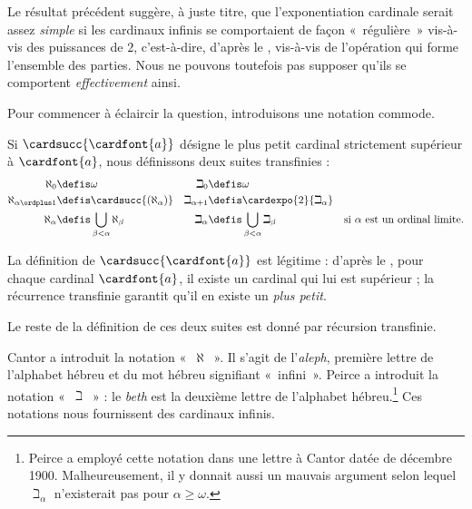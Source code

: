 \documentclass[../../../include/open-logic-section]{subfiles}
\begin{document}


Le résultat précédent suggère, à juste titre,
que l'exponentiation cardinale serait assez
\emph{simple} si les cardinaux infinis se comportaient
de façon «~régulière~» vis-à-vis des puissances de $2$,
c'est-à-dire, d'après le
, vis-à-vis
de l'opération qui forme l'ensemble des parties.
Nous ne pouvons toutefois pas supposer qu'ils
se comportent \emph{effectivement} ainsi.

Pour commencer à éclaircir la question,
introduisons une notation commode.

\begin{defn}
Si $\cardsucc{\cardfont{a}}$ désigne le plus
petit cardinal strictement supérieur à
$\cardfont{a}$, nous définissons deux suites
transfinies :
\begin{align*}
	\aleph_{0} &\defis \omega &
	\beth_{0} &\defis \omega\\
	\aleph_{\alpha \ordplus 1}
	&\defis \cardsucc{(\aleph_{\alpha})} &
	\beth_{\alpha+1}
	&\defis \cardexpo{2}{\beth_{\alpha}}\\
	\aleph_{\alpha}
	&\defis \bigcup_{\beta< \alpha} \aleph_{\beta} &
	\beth_{\alpha}
	&\defis \bigcup_{\beta < \alpha}\beth_{\beta}
	& \text{si $\alpha$ est un ordinal limite}.
\end{align*}
\end{defn}

La définition de $\cardsucc{\cardfont{a}}$
est légitime : d'après le
,
pour chaque cardinal $\cardfont{a}$,
il existe un cardinal qui lui est supérieur ;
la récurrence transfinie garantit qu'il en
existe un \emph{plus petit}.




Le reste de la définition de ces deux suites
est donné par récursion transfinie.

Cantor a introduit la notation «~$\aleph$~».
Il s'agit de l'\emph{aleph}, première lettre
de l'alphabet hébreu et du mot hébreu signifiant
«~infini~». Peirce a introduit la notation
«~$\beth$~» : le \emph{beth} est la deuxième
lettre de l'alphabet hébreu.\footnote{
Peirce a employé cette notation dans une lettre
à Cantor datée de décembre 1900. Malheureusement,
il y donnait aussi un mauvais argument selon
lequel $\beth_\alpha$ n'existerait pas
pour $\alpha \geq \omega$.}
Ces notations nous fournissent des cardinaux
infinis.
\end{document}
